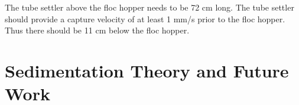 \documentclass[letterpaper,10pt,english]{sphinxmanual}
\begin{document}
\begin{sphinxVerbatim}[commandchars=\\\{\}]
  
    
    
    
    

 
     

\end{sphinxVerbatim}

The tube settler above the floc hopper needs to be 72 cm long. The tube settler should provide a capture velocity of at least 1 mm/s prior to the floc hopper. Thus there should be 11 cm below the floc hopper.


\chapter{Sedimentation Theory and Future Work}
\label{\detokenize{Sedimentation/Sed_Theory_and_Future_Work:sedimentation-theory-and-future-work}}\label{\detokenize{Sedimentation/Sed_Theory_and_Future_Work:id1}}\label{\detokenize{Sedimentation/Sed_Theory_and_Future_Work::doc}}
\end{document}
